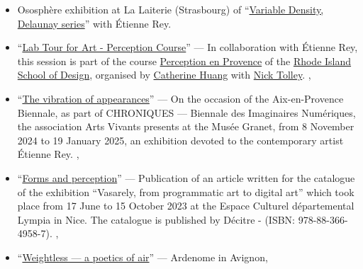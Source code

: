 \documentclass[10pt,english,a4paper,oneside]{article}%
\newcommand{\years}[1]{\marginpar{\textit{\scriptsize #1}}}
\begin{document}
\begin{itemize}
	\item Ososphère exhibition at La Laiterie (Strasbourg) of ``\href{https://laurentperrinet.github.io/post/2026-02-20_ososphere/}{Variable Density, Delaunay series}'' with Étienne Rey.

	\item ``\href{https://laurentperrinet.github.io/talk/2026-01-19-art-and-science}{Lab Tour for Art - Perception Course}'' --- In collaboration with Étienne Rey, this session is part of the course \href{https://www.risd.edu/academics/illustration/courses}{Perception en Provence} of the \href{https://www.risd.edu}{Rhode Island School of Design}, organised by \href{https://www.instagram.com/cathuangart/}{Catherine Huang} with \href{https://www.linkedin.com/in/ntolley/}{Nick Tolley}.	\years{2026},

	\item ``\href{https://laurentperrinet.github.io/post/2024-11-07_vibration-apparences/}{The vibration of appearances}'' --- On the occasion of the Aix-en-Provence Biennale, as part of CHRONIQUES --- Biennale des Imaginaires Numériques, the association Arts Vivants presents at the Musée Granet, from 8 November 2024 to 19 January 2025, an exhibition devoted to the contemporary artist Étienne Rey. \years{2024},

	\item ``\href{https://laurentperrinet.github.io/publication/perrinet-23-formes-et-perception/}{Forms and perception}'' --- Publication of an article written for the catalogue of the exhibition ``Vasarely, from programmatic art to digital art'' which took place from 17 June to 15 October 2023 at the Espace Culturel départemental Lympia in Nice. The catalogue is published by Décitre - (ISBN: 978-88-366-4958-7). \years{2023},

	\item ``\href{https://laurentperrinet.github.io/post/2019-06-22_ardemone/}{Weightless --- a poetics of air}'' --- Ardenome in Avignon\years{2019},


\end{itemize}
\end{document}

